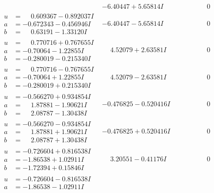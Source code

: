 \documentclass[1p]{elsarticle_modified}
\theoremstyle{definition}
\begin{document}
$$\begin{array}{c|c|c}
 & -6.40447 + 5.65814 I & \phantom{-0.000000 } 0 \\ \hline\begin{aligned}
u &= \phantom{-}0.609367 - 0.892037 I \\
a &= -0.672343 - 0.456946 I \\
b &= \phantom{-}0.63191 - 1.33120 I\end{aligned}
 & -6.40447 - 5.65814 I & \phantom{-0.000000 } 0 \\ \hline\begin{aligned}
u &= \phantom{-}0.770716 + 0.767655 I \\
a &= -0.70064 - 1.22855 I \\
b &= -0.280019 - 0.215340 I\end{aligned}
 & \phantom{-}4.52079 + 2.63581 I & \phantom{-0.000000 } 0 \\ \hline\begin{aligned}
u &= \phantom{-}0.770716 - 0.767655 I \\
a &= -0.70064 + 1.22855 I \\
b &= -0.280019 + 0.215340 I\end{aligned}
 & \phantom{-}4.52079 - 2.63581 I & \phantom{-0.000000 } 0 \\ \hline\begin{aligned}
u &= -0.566270 + 0.934854 I \\
a &= \phantom{-}1.87881 - 1.90621 I \\
b &= \phantom{-}2.08787 - 1.30438 I\end{aligned}
 & -0.476825 - 0.520416 I & \phantom{-0.000000 } 0 \\ \hline\begin{aligned}
u &= -0.566270 - 0.934854 I \\
a &= \phantom{-}1.87881 + 1.90621 I \\
b &= \phantom{-}2.08787 + 1.30438 I\end{aligned}
 & -0.476825 + 0.520416 I & \phantom{-0.000000 } 0 \\ \hline\begin{aligned}
u &= -0.726604 + 0.816538 I \\
a &= -1.86538 + 1.02911 I \\
b &= -1.72394 + 0.15846 I\end{aligned}
 & \phantom{-}3.20551 - 0.41176 I & \phantom{-0.000000 } 0 \\ \hline\begin{aligned}
u &= -0.726604 - 0.816538 I \\
a &= -1.86538 - 1.02911 I \\

\end{aligned}
\end{array}$$
\end{document}
